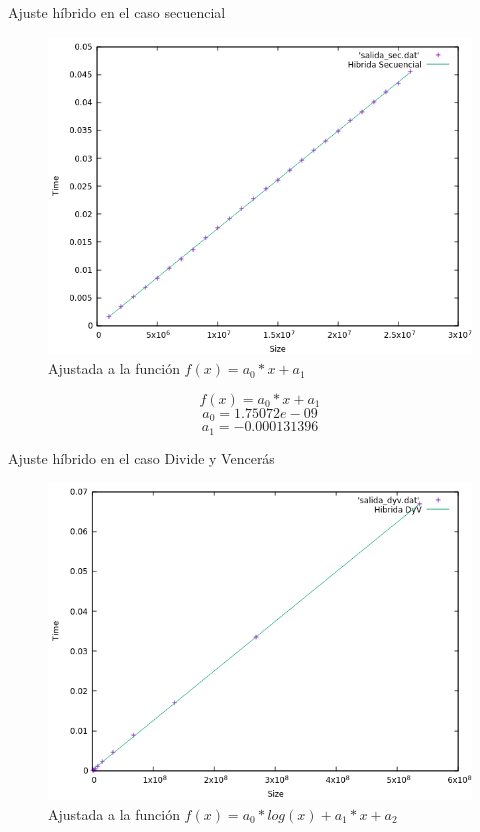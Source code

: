 \documentclass[12pt]{beamer}
\begin{document}
\begin{frame}{Ajuste híbrido en el caso secuencial}

\begin{figure}[H] 
\centering
\includegraphics[angle=0,scale=0.5]{img/AjusteHibridoSec.png} 
\caption{Ajustada a la función $f(x)=a_0*x+a_1$} 
\end{figure}

\end{frame}

\begin{frame}
\[
f(x)=a_0*x+a_1 
\]
\[
a_0=1.75072e-09
\]
\[
a_1=-0.000131396
\]
\end{frame}

\begin{frame}{Ajuste híbrido en el caso Divide y Vencerás}

\begin{figure}[H] 
\centering
\includegraphics[angle=0,scale=0.5]{img/AjusteHibridoDyV.png} 
\caption{Ajustada a la función $f(x)=a_0*log(x)+a_1*x+a_2$} 
\end{figure}

\end{frame}
\end{document}
